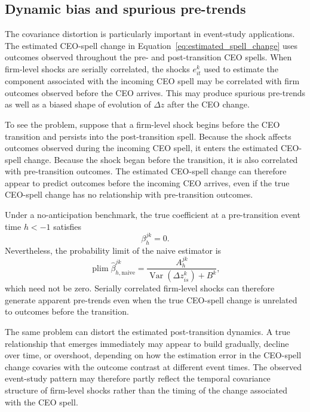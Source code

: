 \documentclass[11pt,a4paper]{article}
\begin{document}
\subsection{Dynamic bias and spurious pre-trends}
\label{subsec:dynamic_bias}

The covariance distortion is particularly important in event-study
applications. The estimated CEO-spell change in
Equation~\eqref{eq:estimated_spell_change} uses outcomes observed
throughout the pre- and post-transition CEO spells. When firm-level
shocks are serially correlated, the shocks $e_{it}^{k}$ used to estimate the component
associated with the incoming CEO spell may be correlated with firm
outcomes observed before the CEO arrives. This may produce spurious pre-trends as well as a biased shape of evolution of $\Delta z$ after the CEO change.

To see the problem, suppose that a firm-level shock begins before the
CEO transition and persists into the post-transition spell. Because the
shock affects outcomes observed during the incoming CEO spell, it
enters the estimated CEO-spell change. Because the shock began before
the transition, it is also correlated with pre-transition outcomes.
The estimated CEO-spell change can therefore appear to predict outcomes
before the incoming CEO arrives, even if the true CEO-spell change has
no relationship with pre-transition outcomes.

Under a no-anticipation benchmark, the true coefficient at a
pre-transition event time $h<-1$ satisfies
\[
\beta_h^{jk}=0.
\]
Nevertheless, the probability limit of the naive estimator is
\begin{equation}
\operatorname{plim}
\widehat\beta_{h,\mathrm{naive}}^{jk}
=
\frac{
A_h^{jk}
}{
\operatorname{Var}\!\left(
\Delta z_{is}^{k}
\right)
+
B^{k}
},
\label{eq:pretrend_bias}
\end{equation}
which need not be zero. Serially correlated firm-level shocks can
therefore generate apparent pre-trends even when the true CEO-spell
change is unrelated to outcomes before the transition.

The same problem can distort the estimated post-transition dynamics.
A true relationship that emerges immediately may appear to build
gradually, decline over time, or overshoot, depending on how the
estimation error in the CEO-spell change covaries with the outcome
contrast at different event times. The observed event-study pattern
may therefore partly reflect the temporal covariance structure of
firm-level shocks rather than the timing of the change associated with
the CEO spell.
\end{document}
